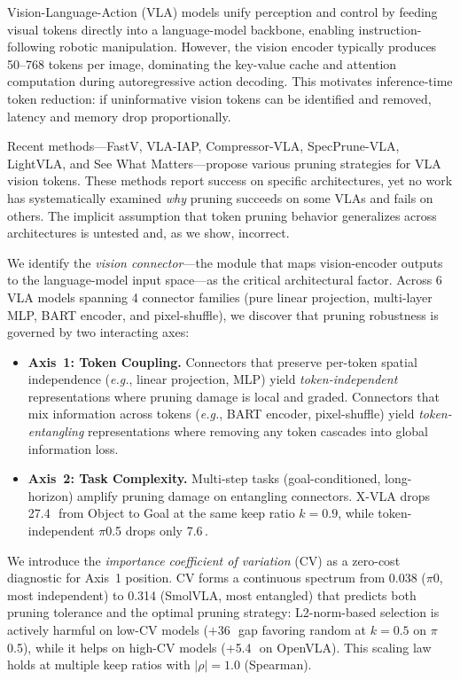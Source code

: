 \documentclass[10pt,letterpaper]{article}
\newcommand{\eg}{\textit{e.g.}}
\newcommand{\pp}{\,\text{pp}}
\begin{document}
Vision-Language-Action (VLA) models unify perception and control by feeding visual tokens directly into a language-model backbone, enabling instruction-following robotic manipulation. However, the vision encoder typically produces 50--768 tokens per image, dominating the key-value cache and attention computation during autoregressive action decoding. This motivates inference-time token reduction: if uninformative vision tokens can be identified and removed, latency and memory drop proportionally.

Recent methods---FastV, VLA-IAP, Compressor-VLA, SpecPrune-VLA, LightVLA, and See What Matters---propose various pruning strategies for VLA vision tokens. These methods report success on specific architectures, yet no work has systematically examined \emph{why} pruning succeeds on some VLAs and fails on others. The implicit assumption that token pruning behavior generalizes across architectures is untested and, as we show, incorrect.

We identify the \emph{vision connector}---the module that maps vision-encoder outputs to the language-model input space---as the critical architectural factor. Across 6 VLA models spanning 4 connector families (pure linear projection, multi-layer MLP, BART encoder, and pixel-shuffle), we discover that pruning robustness is governed by two interacting axes:

\begin{itemize}
\item \textbf{Axis~1: Token Coupling.} Connectors that preserve per-token spatial independence (\eg, linear projection, MLP) yield \emph{token-independent} representations where pruning damage is local and graded. Connectors that mix information across tokens (\eg, BART encoder, pixel-shuffle) yield \emph{token-entangling} representations where removing any token cascades into global information loss.

\item \textbf{Axis~2: Task Complexity.} Multi-step tasks (goal-conditioned, long-horizon) amplify pruning damage on entangling connectors. X-VLA drops 27.4\pp\ from Object to Goal at the same keep ratio $k\!=\!0.9$, while token-independent $\pi$0.5 drops only 7.6\pp.
\end{itemize}

We introduce the \emph{importance coefficient of variation} (CV) as a zero-cost diagnostic for Axis~1 position. CV forms a continuous spectrum from 0.038 ($\pi$0, most independent) to 0.314 (SmolVLA, most entangled) that predicts both pruning tolerance and the optimal pruning strategy: L2-norm-based selection is actively harmful on low-CV models ($+$36\pp\ gap favoring random at $k\!=\!0.5$ on $\pi$0.5), while it helps on high-CV models ($+$5.4\pp\ on OpenVLA). This scaling law holds at multiple keep ratios with $|\rho|\!=\!1.0$ (Spearman).
\end{document}
